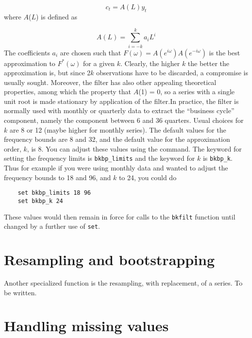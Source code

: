 	    \[ c_t = A(L) y_t \]
	   where $A$($L$) is
	defined as
	
	    \[ A(L) = \sum_{i=-k}^{k} a_i L^i \]
	   The coefficients
	$a\ensuremath{_{i}}$ are chosen such that
        $F(\omega) = A(e^{i\omega})A(e^{-i\omega})$ is the best approximation to
        $F^*(\omega)$ for a given $k$. Clearly, the higher
	$k$ the better the approximation is, but since
	2$k$ observations have to be discarded, a compromise is
	usually sought. Moreover, the filter has also other appealing theoretical
	properties, among which the property that $A$(1) = 0, so
	a series with a single unit root is made stationary by application of the
	filter.In practice, the filter is normally used with monthly or quarterly data
	to extract the ``business cycle'' component, namely the component
	between 6 and 36 quarters. Usual choices for $k$ are 8 or
	12 (maybe higher for monthly series).
      The default values for the frequency bounds are 8 and 32, and the
	default value for the approximation order, $k$, is 8. You
	can adjust these values using the  command. The
	keyword for setting the frequency limits is \verb+bkbp_limits+
	and the keyword for $k$ is \verb+bkbp_k+.
	Thus for example if you were using monthly data and wanted to adjust the
	frequency bounds to 18 and 96, and $k$ to 24, you could
	do
\begin{verbatim}
	set bkbp_limits 18 96
	set bkbp_k 24\end{verbatim}
These values would then remain in force for calls to the
	\verb+bkfilt+ function until changed by a further use of
	\verb+set+. 
      

\section{Resampling and bootstrapping}
\label{genr-resample}

Another specialized function is the resampling, with replacement, of a
      series.  To be written.
    

\section{Handling missing values}
\label{genr-missing}

